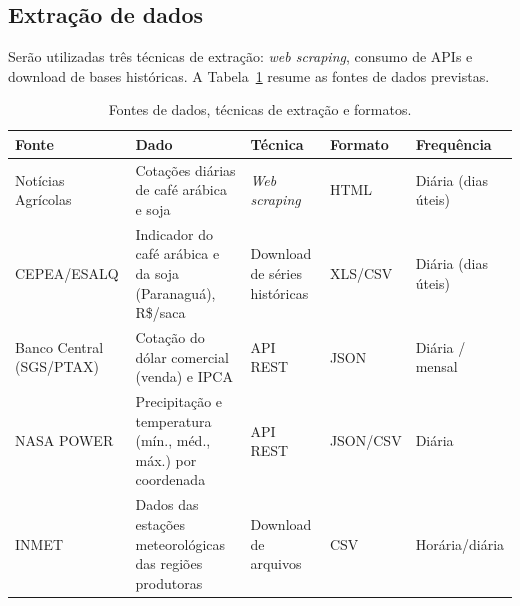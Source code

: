 \documentclass{article}
\begin{document}
\subsection{Extração de dados}

Serão utilizadas três técnicas de extração: \textit{web scraping}, consumo de APIs e download de bases
históricas. A Tabela~\ref{tab:fontes} resume as fontes de dados previstas.

\begin{table}[H]
      \centering
      \small
      \caption{Fontes de dados, técnicas de extração e formatos.}
      \label{tab:fontes}
      \begin{tabularx}{\textwidth}{>{\raggedright\arraybackslash}p{2.6cm}
                  >{\raggedright\arraybackslash}X
                  >{\raggedright\arraybackslash}p{2.8cm}
                  >{\raggedright\arraybackslash}p{1.6cm}
                  >{\raggedright\arraybackslash}p{1.7cm}}
            \toprule
            \textbf{Fonte}          & \textbf{Dado}                                         &
            \textbf{Técnica}        & \textbf{Formato}                                      & \textbf{Frequência} \\
            \midrule
            Notícias Agrícolas      & Cotações diárias de café arábica e soja               &
            \textit{Web scraping}   & HTML                                                  & Diária (dias úteis) \\
            CEPEA/ESALQ             & Indicador do café arábica e da soja (Paranaguá), R\$/saca &
            Download de séries históricas & XLS/CSV                                         & Diária (dias úteis) \\
            Banco Central (SGS/PTAX) & Cotação do dólar comercial (venda) e IPCA            &
            API REST                & JSON                                                  & Diária / mensal     \\
            NASA POWER              & Precipitação e temperatura (mín., méd., máx.) por coordenada &
            API REST                & JSON/CSV                                              & Diária              \\
            INMET                   & Dados das estações meteorológicas das regiões produtoras &
            Download de arquivos    & CSV                                                   & Horária/diária      \\
            \bottomrule
      \end{tabularx}
\end{table}
\end{document}
